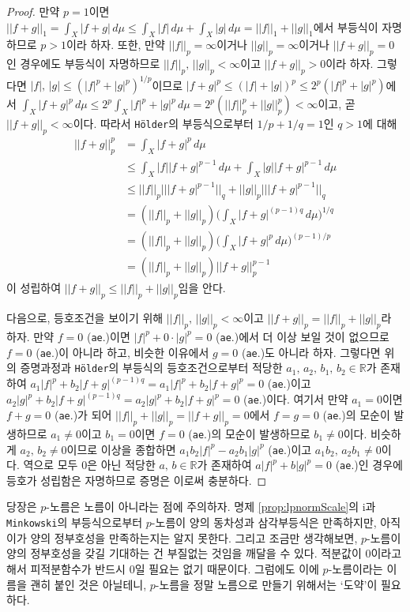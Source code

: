 \begin{proof}
    만약 $p=1$이면 $||f+g||_1=\int_X|f+g|\,d\mu\leq\int_X|f|\,d\mu+\int_X|g|\,d\mu=||f||_1+||g||_1$에서 부등식이 자명하므로 $p>1$이라 하자. 또한, 만약 $||f||_p=\infty$이거나 $||g||_p=\infty$이거나 $||f+g||_p=0$인 경우에도 부등식이 자명하므로 $||f||_p,\,||g||_p<\infty$이고 $||f+g||_p>0$이라 하자. 그렇다면 $|f|,\,|g|\leq(|f|^p+|g|^p)^{1/p}$이므로 $|f+g|^p\leq(|f|+|g|)^p\leq2^p(|f|^p+|g|^p)$에서 $\int_X|f+g|^p\,d\mu\leq2^p\int_X|f|^p+|g|^p\,d\mu=2^p(||f||_p^p+||g||_p^p)<\infty$이고, 곧 $||f+g||_p<\infty$이다. 따라서 \texttt{H\"older}의 부등식으로부터 $1/p+1/q=1$인 $q>1$에 대해
    \begin{align*}
        ||f+g||_p^p&=\int_X|f+g|^p\,d\mu\\
        &\leq\int_X|f||f+g|^{p-1}\,d\mu+\int_X|g||f+g|^{p-1}\,d\mu\\
        &\leq||f||_p|||f+g|^{p-1}||_q+||g||_p|||f+g|^{p-1}||_q\\
        &=(||f||_p+||g||_p)\bigg(\int_X|f+g|^{(p-1)q}\,d\mu\bigg)^{1/q}\\
        &=(||f||_p+||g||_p)\bigg(\int_X|f+g|^p\,d\mu\bigg)^{(p-1)/p}\\
        &=(||f||_p+||g||_p)||f+g||_p^{p-1}
    \end{align*}
    이 성립하여 $||f+g||_p\leq||f||_p+||g||_p$임을 안다.

    다음으로, 등호조건을 보이기 위해 $||f||_p,\,||g||_p<\infty$이고 $||f+g||_p=||f||_p+||g||_p$라 하자. 만약 $f=0$ (\texttt{ae}.)이면 $|f|^p+0\cdot|g|^p=0$ (\texttt{ae}.)에서 더 이상 보일 것이 없으므로 $f=0$ (\texttt{ae}.)이 아니라 하고, 비슷한 이유에서 $g=0$ (\texttt{ae}.)도 아니라 하자. 그렇다면 위의 증명과정과 \texttt{H\"older}의 부등식의 등호조건으로부터 적당한 $a_1,\,a_2,\,b_1,\,b_2\in\mathbb{R}$가 존재하여 $a_1|f|^p+b_2|f+g|^{(p-1)q}=a_1|f|^p+b_2|f+g|^p=0$ (\texttt{ae}.)이고 $a_2|g|^p+b_2|f+g|^{(p-1)q}=a_2|g|^p+b_2|f+g|^p=0$ (\texttt{ae}.)이다. 여기서 만약 $a_1=0$이면 $f+g=0$ (\texttt{ae}.)가 되어 $||f||_p+||g||_p=||f+g||_p=0$에서 $f=g=0$ (\texttt{ae}.)의 모순이 발생하므로 $a_1\ne0$이고 $b_1=0$이면 $f=0$ (\texttt{ae}.)의 모순이 발생하므로 $b_1\ne0$이다. 비슷하게 $a_2,\,b_2\ne0$이므로 이상을 종합하면 $a_1b_2|f|^p-a_2b_1|g|^p$ (\texttt{ae}.)이고 $a_1b_2,\,a_2b_1\ne0$이다. 역으로 모두 $0$은 아닌 적당한 $a,\,b\in\mathbb{R}$가 존재하여 $a|f|^p+b|g|^p=0$ (\texttt{ae}.)인 경우에 등호가 성립함은 자명하므로 증명은 이로써 충분하다.
\end{proof}

당장은 $p$-노름은 노름이 아니라는 점에 주의하자. 명제 \ref{prop:lpnormScale}의 i과 \texttt{Minkowski}의 부등식으로부터 $p$-노름이 양의 동차성과 삼각부등식은 만족하지만, 아직 이가 양의 정부호성을 만족하는지는 알지 못한다. 그리고 조금만 생각해보면, $p$-노름이 양의 정부호성을 갖길 기대하는 건 부질없는 것임을 깨달을 수 있다. 적분값이 0이라고 해서 피적분함수가 반드시 0일 필요는 없기 때문이다. 그럼에도 이에 $p$-노름이라는 이름을 괜히 붙인 것은 아닐테니, $p$-노름을 정말 노름으로 만들기 위해서는 `도약'이 필요하다.

